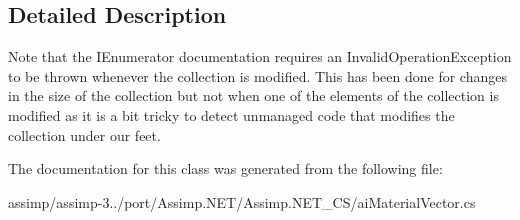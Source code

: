 \subsection{Detailed Description}
Note that the I\+Enumerator documentation requires an Invalid\+Operation\+Exception to be thrown whenever the collection is modified. This has been done for changes in the size of the collection but not when one of the elements of the collection is modified as it is a bit tricky to detect unmanaged code that modifies the collection under our feet. 

The documentation for this class was generated from the following file\+:\begin{DoxyCompactItemize}
\item 
assimp/assimp-\/3../port/\+Assimp.\+N\+E\+T/\+Assimp.\+N\+E\+T\+\_\+\+C\+S/ai\+Material\+Vector.\+cs\end{DoxyCompactItemize}
